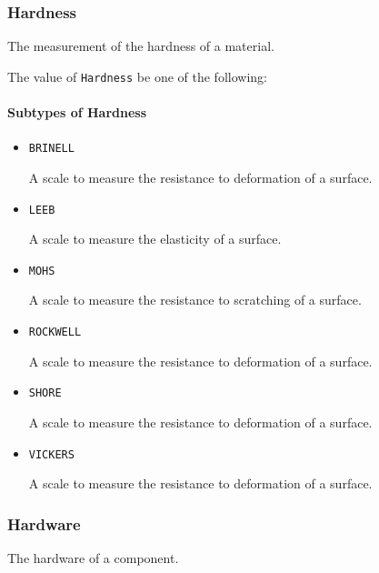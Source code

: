 \FloatBarrier

\subsubsection{Hardness}
\label{sec:Hardness}



The measurement of the hardness of a material.


The value of \texttt{Hardness} \MUST be one of the following: 

\FloatBarrier

\paragraph{Subtypes of Hardness}\mbox{}
\label{sec:Subtypes of Hardness}

\begin{itemize}

\item \texttt{BRINELL}


A scale to measure the resistance to deformation of a surface.

\item \texttt{LEEB}


A scale to measure the elasticity of a surface.

\item \texttt{MOHS}


A scale to measure the resistance to scratching of a surface.

\item \texttt{ROCKWELL}


A scale to measure the resistance to deformation of a surface.

\item \texttt{SHORE}


A scale to measure the resistance to deformation of a surface.

\item \texttt{VICKERS}


A scale to measure the resistance to deformation of a surface.


\end{itemize}

\subsubsection{Hardware}




The hardware of a component.


